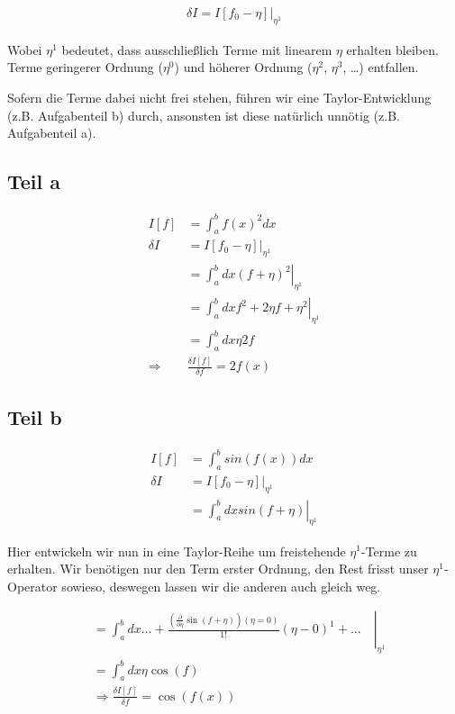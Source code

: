 \documentclass[a4paper,german,12pt,smallheadings]{scrartcl}
\begin{document}
\begin{align*}
  \delta I = \left.I[f_0 - \eta]\right|_{\eta^1}
\end{align*}

Wobei $\eta^1$ bedeutet, dass ausschließlich Terme mit linearem $\eta$ erhalten
bleiben. Terme geringerer Ordnung ($\eta^0$) und höherer Ordnung ($\eta^2$,
$\eta^3$, \dots) entfallen.

Sofern die Terme dabei nicht frei stehen, führen wir eine Taylor-Entwicklung
(z.B. Aufgabenteil b) durch, ansonsten ist diese natürlich unnötig (z.B.
Aufgabenteil a).

\subsection*{Teil a}

\begin{align*}
  I[f] &= \int_a^b f(x)^2 dx \\
  \delta I &= \left.I[f_0 - \eta]\right|_{\eta^1} \\
  &=\left.\int_a^b dx (f+\eta)^2 \right|_{\eta^1} \\
  &=\left.\int_a^b dx f^2 + 2 \eta f + \eta^2 \right|_{\eta^1} \\
  &=\int_a^b dx \eta 2 f \\
  \Rightarrow& \frac{\delta I[f]}{\delta f} = 2f(x)
\end{align*}

\subsection*{Teil b}

\begin{align*}
  I[f] &= \int_a^b sin(f(x)) dx \\
  \delta I &= \left.I[f_0 - \eta]\right|_{\eta^1} \\
  &=\left.\int_a^b dx sin(f+\eta) \right|_{\eta^1}
\end{align*}

Hier entwickeln wir nun in eine Taylor-Reihe um freistehende $\eta^1$-Terme zu
erhalten. Wir benötigen nur den Term erster Ordnung, den Rest frisst unser
$\eta^1$-Operator sowieso, deswegen lassen wir die anderen auch gleich weg.

\begin{align*}
  &=\left.\int_a^b dx \dots + \frac{\left(\frac{\partial}{\partial \eta} \sin(f+\eta)\right)(\eta=0)}{1!} (\eta - 0)^1 + \dots\quad\right|_{\eta^1} \\
  &=\int_a^b dx \eta \cos(f) \\
  &\Rightarrow \frac{\delta I[f]}{\delta f} = \cos(f(x))
\end{align*}
\end{document}
